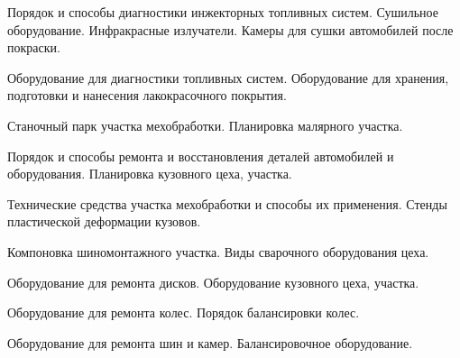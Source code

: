 \documentclass[
	14pt,
	a4paper,
	]
	{scrartcl}
\begin{document}
\vfill

\newpage


\shapk
{}
\setcounter{zad}{0}

\vfill
\z Порядок и способы диагностики инжекторных топливных систем.
 \vfill
\z Сушильное оборудование. Инфракрасные излучатели. Камеры для сушки автомобилей после покраски.
 \vfill

\vfill

\newpage


\shapk
{}
\setcounter{zad}{0}

\vfill
\z Оборудование для диагностики топливных систем.
 \vfill
\z Оборудование для хранения, подготовки и нанесения лакокрасочного покрытия.
 \vfill

\vfill

\newpage


\shapk
{}
\setcounter{zad}{0}

\vfill
\z Станочный парк участка мехобработки.
 \vfill
\z Планировка малярного участка.
 \vfill

\vfill

\newpage


\shapk
{}
\setcounter{zad}{0}

\vfill
\z Порядок и способы ремонта и восстановления деталей автомобилей и оборудования.
 \vfill
\z Планировка кузовного цеха, участка.
 \vfill

\vfill

\newpage


\shapk
{}
\setcounter{zad}{0}

\vfill
\z Технические средства участка мехобработки и способы их применения.
 \vfill
\z Стенды пластической деформации кузовов.
 \vfill

\vfill

\newpage


\shapk
{}
\setcounter{zad}{0}

\vfill
\z Компоновка шиномонтажного участка.
 \vfill
\z Виды сварочного оборудования цеха.
 \vfill

\vfill

\newpage


\shapk
{}
\setcounter{zad}{0}

\vfill
\z Оборудование для ремонта дисков.
 \vfill
\z Оборудование кузовного цеха, участка.
 \vfill

\vfill

\newpage


\shapk
{}
\setcounter{zad}{0}

\vfill
\z Оборудование для ремонта колес.
 \vfill
\z Порядок балансировки колес.
 \vfill

\vfill

\newpage


\shapk
{}
\setcounter{zad}{0}

\vfill
\z Оборудование для ремонта шин и камер.
 \vfill
\z Балансировочное оборудование.
 \vfill

\vfill

\newpage
\end{document}
